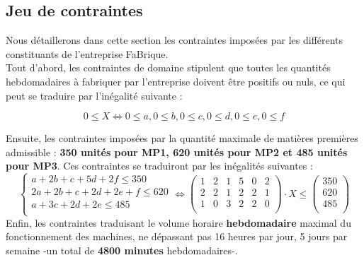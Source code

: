 \documentclass[a4paper, 11pt]{article}
\begin{document}
\subsection*{Jeu de contraintes}
Nous détaillerons dans cette section les contraintes imposées par les différents constituants de l'entreprise FaBrique. \\
Tout d'abord, les contraintes de domaine stipulent que toutes les quantités hebdomadaires à fabriquer par l'entreprise doivent être positifs ou nuls, ce qui peut se traduire par l'inégalité suivante :
\begin{center}
$$0 \leq X \Leftrightarrow 0 \leq a ,0 \leq b ,0 \leq c ,0 \leq d ,0 \leq e ,0 \leq f $$
\end{center}
Ensuite, les contraintes imposées par la quantité maximale de matières premières admissible : \textbf{350 unités pour MP1, 620 unités pour MP2 et 485 unités pour MP3}. Ces contraintes se traduiront par les inégalités suivantes :
$$
\left\{\begin{split}
	a+2b+c+5d+2f \leq 350 \\
    2a+2b+c+2d+2e+f  \leq 620 \\
    a+3c+2d+2e \leq 485 \\
\end{split}\right. \Leftrightarrow \begin{pmatrix}
        1&2&1&5&0&2 \\
        2&2&1&2&2&1\\
        1&0&3&2&2&0\\
    \end{pmatrix} \cdot X \leq \begin{pmatrix}
        350 \\
        620\\
        485\\
    \end{pmatrix}
$$
Enfin, les contraintes traduisant le volume horaire \textbf{hebdomadaire} maximal du fonctionnement des machines, ne dépassant pas 16 heures par jour, 5 jours par semaine -un total de \textbf{4800 minutes} hebdomadaires-.
\end{document}
